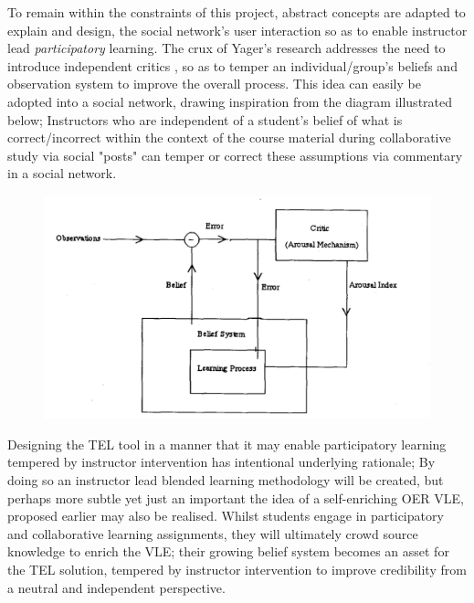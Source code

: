 \begin{itemize}[\null]
    To remain within the constraints of this project, abstract concepts are adapted to explain and design, the social network's user interaction so as to enable instructor lead \textit{participatory} learning. The crux of Yager's research addresses the need to introduce independent critics \cite{Yager2004a,Yager2004,Yager1990}, so as to temper an individual/group's beliefs and observation system \cite{Yager1990} to improve the overall process. This idea can easily be adopted into a social network, drawing inspiration from the diagram illustrated below; Instructors who are independent of a student's belief of what is correct/incorrect within the context of the course material during collaborative study via social "posts" can temper or correct these assumptions via commentary in a social network.
\begin{figure}[H]
	\centering
	\includegraphics[scale=0.5]{figures/particip}
	\label{fig:Relationship Between Learning Process,Belief System and Critic}
\end{figure}
    \newpage
    Designing the TEL tool in a manner that it may enable participatory learning tempered by instructor intervention has intentional underlying rationale; By doing so an instructor lead blended learning methodology will be created, but perhaps more subtle yet just an important the idea of a self-enriching OER VLE, proposed earlier may also be realised. Whilst students engage in participatory and collaborative learning assignments, they will ultimately crowd source knowledge to enrich the VLE; their growing belief system becomes an asset for the TEL solution, tempered by instructor intervention to improve credibility from a neutral and independent perspective.
    
    \end{itemize}
    
    
    
    